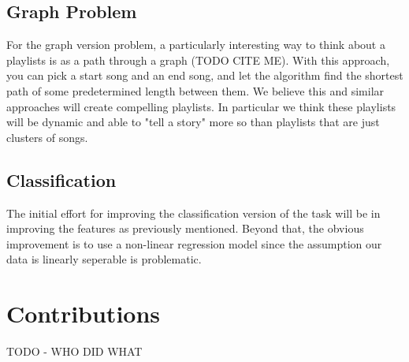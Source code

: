 \documentclass[10pt,journal,compsoc]{IEEEtran}
\begin{document}
\subsection{Graph Problem}
For the graph version problem, a particularly interesting way to think about a playlists is as a path through a graph (TODO CITE ME). With this approach, you can pick a start song and an end song, and let the algorithm find the shortest path of some predetermined length between them. We believe this and similar approaches will create compelling playlists. In particular we think these playlists will be dynamic and able to "tell a story" more so than playlists that are just clusters of songs. 

\subsection{Classification}
The initial effort for improving the classification version of the task will be in improving the features as previously mentioned. Beyond that, the obvious improvement is to use a non-linear regression model since the assumption our data is linearly seperable is problematic. 

\section{Contributions}
TODO - WHO DID WHAT

{}


%

\end{document}
